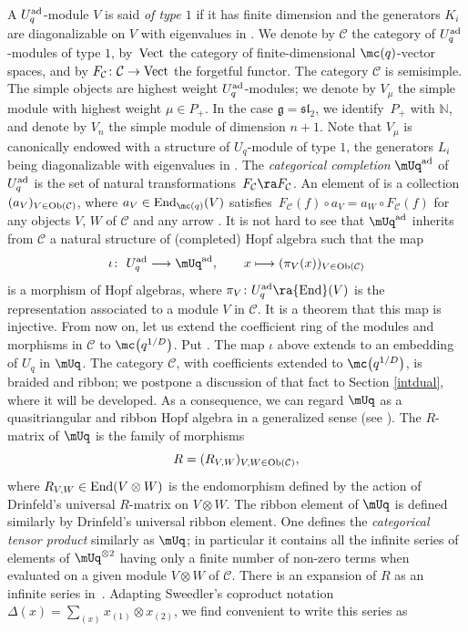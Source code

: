 A $U_q^{\rm ad}$-module $V$ is said {\it of type $1$} if it has finite dimension and the generators $K_i$ are diagonalizable on $V$ with eigenvalues in . We denote by $\mathcal{C}$ the category of $U_q^{\rm ad}$-modules of type $1$, by~${\rm Vect}$ the category of finite-dimensional $\mc(q)$-vector spaces, and by $F_{\mathcal C}\colon{\mathcal C}\to {\rm Vect}$ the forgetful functor. The category $\mathcal{C}$ is semisimple. The simple objects are highest weight $U_q^{\rm ad}$-modules; we denote by $V_\mu$ the simple module with highest weight $\mu\in P_+$. In the case $\mathfrak{g}={\mathfrak{sl}_2}$, we identify~$P_+$ with $\mathbb{N}$, and denote by $V_n$ the simple module of dimension $n+1$. Note that $V_\mu$ is canonically endowed with a structure of $U_q$-module of type $1$, the generators $L_i$ being diagonalizable with eigenvalues in . The {\it categorical completion} $\mUq^{\rm ad}$ of $U_q^{\rm ad}$ is the set of natural transformations~${F_{\mathcal C}\ra F_{\mathcal C}}$. An element of  is a collection $(a_V)_{V\in {\rm Ob}(\mathcal{C})}$, where $a_V\in {\rm End}_{\mc(q)}(V)$ satisfies~${F_{\mathcal C}(f)\circ a_V=a_W\circ F_{\mathcal C}(f)}$ for any objects $V$, $W$ of $\mathcal{C}$ and any arrow . It is not hard to see that $\mUq^{\rm ad}$ inherits from $\mathcal{C}$ a natural structure of (completed) Hopf algebra such that the map
\begin{gather}\label{defiota}
\iota\colon\ U_q^{\rm ad} \longrightarrow \mUq^{\rm ad}, \qquad x\longmapsto(\pi_V(x))_{V\in {\rm Ob}(\mathcal{C})}
\end{gather}
is a morphism of Hopf algebras, where $\pi_V\colon U_q^{\rm ad} \ra {\rm End}(V)$ is the representation associated to a module $V$ in $\mathcal{C}$. It is a theorem that this map is injective. From now on, let us extend the coefficient ring of the modules and morphisms in $\mathcal{C}$ to $\mc\big(q^{1/D}\big)$. Put .
The map $\iota$ above extends to an embedding of $U_q$ in $\mUq$. The category $\mathcal{C}$, with coefficients extended to $\mc\big(q^{1/D}\big)$, is braided and ribbon; we postpone a discussion of that fact to Section \ref{intdual}, where it will be developed. As a consequence, we can regard $\mUq$ as a quasitriangular and ribbon Hopf algebra in a generalized sense (see \cite{BR}). The $R$-matrix of $\mUq$ is the family of morphisms
\[R = (R_{V,W})_{V,W\in {\rm Ob}(\mathcal{C})},\]
where $R_{V,W}\in {\rm End}(V\otimes W)$ is the endomorphism defined by the action of Drinfeld's universal $R$-matrix on $V\otimes W$. The ribbon element of $\mUq$ is defined similarly by Drinfeld's universal ribbon element. One defines the {\it categorical tensor product}  similarly as $\mUq$; in particular it contains all the infinite series of elements of $\mUq^{\otimes 2}$ having only a finite number of non-zero terms when evaluated on a given module $V\otimes W$ of $\mathcal{C}$. There is an expansion of $R$ as an infinite series in~. Adapting Sweedler's coproduct notation $ \Delta(x)=\sum_{(x)}x_{(1)}\otimes x_{(2)}$, we find convenient to write this series as
